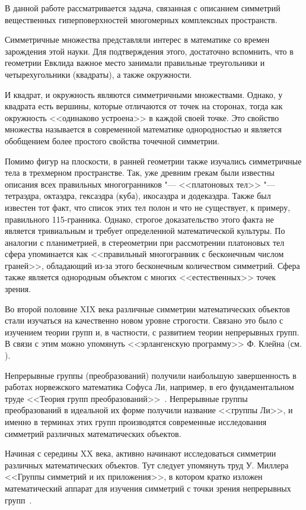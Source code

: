 \documentclass[../main.tex]{subfiles}
\begin{document}
В данной работе рассматривается задача, связанная с описанием симметрий вещественных гиперповерхностей многомерных комплексных пространств.

Симметричные множества представляли интерес в математике со времен зарождения этой науки. Для подтверждения этого, достаточно вспомнить, что в геометрии Евклида важное место занимали правильные треугольники и четырехугольники (квадраты), а также окружности.

И квадрат, и окружность являются симметричными множествами. Однако, у квадрата есть вершины, которые отличаются от точек на сторонах, тогда как окружность <<одинаково устроена>> в каждой своей точке. Это свойство множества называется в современной математике однородностью и является обобщением более простого свойства точечной симметрии.

Помимо фигур на плоскости, в ранней геометрии также изучались симметричные тела в трехмерном пространстве. Так, уже древним грекам были известны описания всех правильных многогранников "--- <<платоновых тел>> "--- тетраэдра, октаэдра, гексаэдра (куба), икосаэдра и додекаэдра. Также был известен тот факт, что список этих тел полон и что не существует, к примеру, правильного 115-гранника. Однако, строгое доказательство этого факта не является тривиальным и требует определенной математической культуры. По аналогии с планиметрией, в стереометрии при рассмотрении платоновых тел сфера упоминается как <<правильный многогранник с бесконечным числом граней>>, обладающий из-за этого бесконечным количеством симметрий. Сфера также является однородным объектом с многих <<естественных>> точек зрения.

Во второй половине XIX века различные симметрии математических объектов стали изучаться на качественно новом уровне строгости. Связано это было с изучением теории групп и, в частности, с развитием теории непрерывных групп. В связи с этим можно упомянуть <<эрлангенскую программу>> Ф. Клейна (см. \cite{klein}).

Непрерывные группы (преобразований) получили наибольшую завершенность в работах норвежского математика Софуса Ли, например, в его фундаментальном труде <<Теория групп преобразований>>~\cite{lie}. Непрерывные группы преобразований в идеальной их форме получили название <<группы Ли>>, и именно в терминах этих групп производятся современные исследования симметрий различных математических объектов.

Начиная с середины XX века, активно начинают исследоваться симметрии различных математических объектов. Тут следует упомянуть труд У. Миллера <<Группы симметрий и их приложения>>, в котором кратко изложен математический аппарат для изучения симметрий с точки зрения непрерывных групп~\cite{miller1973symmetry}.
\end{document}
